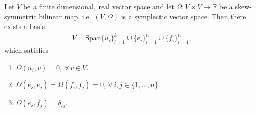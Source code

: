 \documentclass[11pt, final]{article}
\begin{document}
\begin{theorem}
	Let $V$ be a finite dimensional, real vector space and let $\Omega: V \times V \to \mathbb{R}$ be a skew-symmetric bilinear map, i.e. $(V,\Omega)$ is a symplectic vector space. Then there exists a basis 
		\begin{align}
			V = \mathrm{Span} \{ u_i \}_{i=1}^k \cup \{ e_i \}_{i=1}^n \cup \{ f_i \}_{i=1}^n,
		\end{align}
	which satisfies
		\begin{enumerate}[label = (\roman*)]
			\item $\Omega ( u_i, v ) = 0$, $\forall \, v \in V$.
			\item $\Omega(e_i,e_j) = \Omega(f_i,f_j) = 0$, $\forall \, i,j \in \{1,\ldots, n\}$.
			\item $\Omega(e_i,f_j) = \delta_{ij}$.
		\end{enumerate}
\end{theorem}
\end{document}
